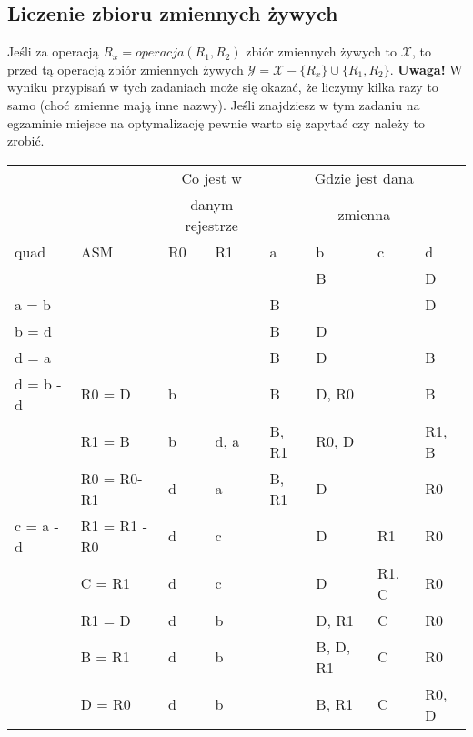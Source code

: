 \subsection{Liczenie zbioru zmiennych żywych}
Jeśli za operacją $R_x = operacja(R_1, R_2)$ zbiór zmiennych żywych to $\mathcal{X}$, to przed tą operacją zbiór zmiennych żywych $\mathcal{Y} = \mathcal{X} - \{R_x\} \cup \{R_1, R_2\}$. \textbf{Uwaga!} W wyniku przypisań w tych zadaniach może się okazać, że liczymy kilka razy to samo (choć zmienne mają inne nazwy). Jeśli znajdziesz w tym zadaniu na egzaminie miejsce na optymalizację pewnie warto się zapytać czy należy to zrobić.

\begin{table}[H]
\begin{tabular}{p{}|p{}|p{}|p{}|p{}|p{}|p{}|p{}}
& & \multicolumn{2}{c}{Co jest w} & \multicolumn{4}{c}{Gdzie jest dana} \\
& & \multicolumn{2}{c}{danym rejestrze} & \multicolumn{4}{c}{zmienna} \\
\hline 
 quad & ASM & R0 & R1 & a & b & c & d \\
\hline 
  &  &  &  &  & B &  & D \\
\hline 
 a = b &  &  &  & B &  &  & D \\
\hline 
 b = d &  &  &  & B & D &  &  \\
\hline 
 d = a &  &  &  & B & D &  & B \\
\hline 
 d = b - d & R0 = D & b &  & B & D, R0 &  & B \\
\hline 
  & R1 = B & b & d, a & B, R1 & R0, D &  & R1, B \\
\hline 
  & R0 = R0-R1 & d & a & B, R1 & D &  & R0 \\
\hline 
 c = a - d   & R1 = R1 - R0 & d & c & & D & R1 & R0 \\
\hline 
  & C = R1 & d & c &  & D & R1, C  & R0 \\
\hline 
  & R1 = D & d & b &  & D, R1 & C  & R0 \\
\hline 
  & B = R1 & d & b &  & B, D, R1 & C & R0 \\
\hline 
  & D = R0 & d & b &  & B, R1 & C & R0, D 
\end{tabular}
\end{table}